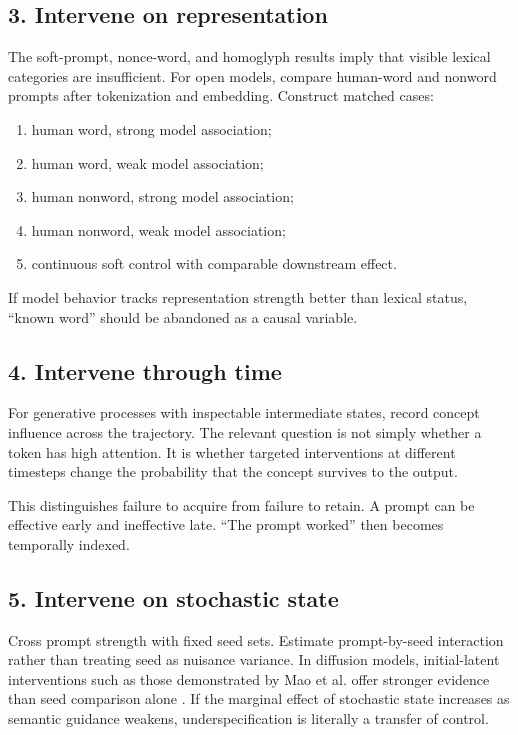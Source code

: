 \documentclass[11pt]{article}
\begin{document}
\subsection{3. Intervene on representation}

The soft-prompt, nonce-word, and homoglyph results imply that visible lexical categories are insufficient. For open models, compare human-word and nonword prompts after tokenization and embedding. Construct matched cases:
\begin{enumerate}[leftmargin=1.5em]
\item human word, strong model association;
\item human word, weak model association;
\item human nonword, strong model association;
\item human nonword, weak model association;
\item continuous soft control with comparable downstream effect.
\end{enumerate}
If model behavior tracks representation strength better than lexical status, ``known word'' should be abandoned as a causal variable.

\subsection{4. Intervene through time}

For generative processes with inspectable intermediate states, record concept influence across the trajectory. The relevant question is not simply whether a token has high attention. It is whether targeted interventions at different timesteps change the probability that the concept survives to the output.

This distinguishes failure to acquire from failure to retain. A prompt can be effective early and ineffective late. ``The prompt worked'' then becomes temporally indexed.

\subsection{5. Intervene on stochastic state}

Cross prompt strength with fixed seed sets. Estimate prompt-by-seed interaction rather than treating seed as nuisance variance. In diffusion models, initial-latent interventions such as those demonstrated by Mao et al. offer stronger evidence than seed comparison alone \citep{Mao2023InitialImageEditing}. If the marginal effect of stochastic state increases as semantic guidance weakens, underspecification is literally a transfer of control.
\end{document}
